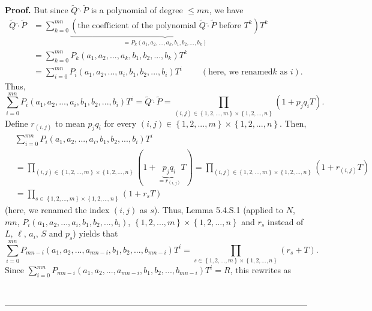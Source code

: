 \documentclass[numbers=enddot,12pt,final,onecolumn,notitlepage]{scrartcl}%
\newenvironment{proof}[1][Proof]{\noindent\textbf{#1.} }{\ \rule{0.5em}{0.5em}}
\begin{document}
\begin{proof}
But since $\widetilde{Q}\widehat{\cdot}\widetilde{P}$ is a polynomial of
degree $\leq mn$, we have%
\begin{align*}
\widetilde{Q}\widehat{\cdot}\widetilde{P}  &  =\sum_{k=0}^{mn}%
\underbrace{\left(  \text{the coefficient of the polynomial }\widetilde{Q}%
\widehat{\cdot}\widetilde{P}\text{ before }T^{k}\right)  }_{=P_{k}\left(
a_{1},a_{2},...,a_{k},b_{1},b_{2},...,b_{k}\right)  }T^{k}\\
&  =\sum_{k=0}^{mn}P_{k}\left(  a_{1},a_{2},...,a_{k},b_{1},b_{2}%
,...,b_{k}\right)  T^{k}\\
&  =\sum_{i=0}^{mn}P_{i}\left(  a_{1},a_{2},...,a_{i},b_{1},b_{2}%
,...,b_{i}\right)  T^{i}\ \ \ \ \ \ \ \ \ \ \left(  \text{here, we renamed
}k\text{ as }i\right)  .
\end{align*}
Thus,%
\[
\sum_{i=0}^{mn}P_{i}\left(  a_{1},a_{2},...,a_{i},b_{1},b_{2},...,b_{i}%
\right)  T^{i}=\widetilde{Q}\widehat{\cdot}\widetilde{P}=\prod\limits_{\left(
i,j\right)  \in\left\{  1,2,...,m\right\}  \times\left\{  1,2,...,n\right\}
}\left(  1+p_{j}q_{i}T\right)  .
\]
Define $r_{\left(  i,j\right)  }$ to mean $p_{j}q_{i}$ for every $\left(
i,j\right)  \in\left\{  1,2,...,m\right\}  \times\left\{  1,2,...,n\right\}
$. Then,%
\begin{align*}
&  \sum_{i=0}^{mn}P_{i}\left(  a_{1},a_{2},...,a_{i},b_{1},b_{2}%
,...,b_{i}\right)  T^{i}\\
&  =\prod\limits_{\left(  i,j\right)  \in\left\{  1,2,...,m\right\}
\times\left\{  1,2,...,n\right\}  }\left(  1+\underbrace{p_{j}q_{i}%
}_{=r_{\left(  i,j\right)  }}T\right)  =\prod\limits_{\left(  i,j\right)
\in\left\{  1,2,...,m\right\}  \times\left\{  1,2,...,n\right\}  }\left(
1+r_{\left(  i,j\right)  }T\right) \\
&  =\prod\limits_{s\in\left\{  1,2,...,m\right\}  \times\left\{
1,2,...,n\right\}  }\left(  1+r_{s}T\right)
\end{align*}
(here, we renamed the index $\left(  i,j\right)  $ as $s$). Thus, Lemma
5.4.S.1 (applied to $N$, $mn$, $P_{i}\left(  a_{1},a_{2},...,a_{i},b_{1}%
,b_{2},...,b_{i}\right)  $, $\left\{  1,2,...,m\right\}  \times\left\{
1,2,...,n\right\}  $ and $r_{s}$ instead of $L$, $\ell$, $a_{i}$, $S$ and
$p_{s}$) yields that%
\[
\sum\limits_{i=0}^{mn}P_{mn-i}\left(  a_{1},a_{2},...,a_{mn-i},b_{1}%
,b_{2},...,b_{mn-i}\right)  T^{i}=\prod\limits_{s\in\left\{
1,2,...,m\right\}  \times\left\{  1,2,...,n\right\}  }\left(  r_{s}+T\right)
.
\]
Since $\sum\limits_{i=0}^{mn}P_{mn-i}\left(  a_{1},a_{2},...,a_{mn-i}%
,b_{1},b_{2},...,b_{mn-i}\right)  T^{i}=R$, this rewrites as%

\end{proof}
\end{document}
